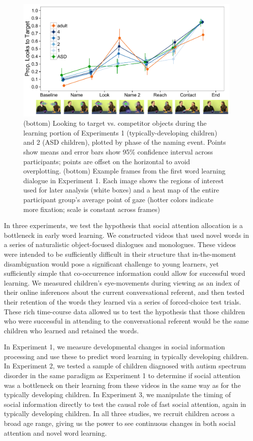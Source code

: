 \documentclass{pnastwo}
\begin{document}
\begin{article}
\begin{figure}
        \includegraphics[width=.95\textwidth]{figures/bronto_all.pdf}
	\caption{\label{fig:reflook_learning} (bottom) Looking to target vs. competitor objects during the learning portion of Experiments 1 (typically-developing children) and 2 (ASD children), plotted by phase of the naming event. Points show means and error bars show 95\% confidence interval across participants; points are offset on the horizontal to avoid overplotting. (bottom) Example frames from the first word learning dialogue in Experiment 1. Each image shows the regions of interest used for later analysis (white boxes) and a heat map of the entire participant group's average point of gaze (hotter colors indicate more fixation; scale is constant across frames)}
\end{figure}

In three experiments, we test the hypothesis that social attention allocation is a bottleneck in early word learning. We constructed videos that used novel words in a series of naturalistic object-focused dialogues and monologues. These videos were intended to be sufficiently difficult in their structure that in-the-moment disambiguation would pose a significant challenge to young learners, yet sufficiently simple that co-occurrence information could allow for successful word learning. We measured children's eye-movements during viewing as an index of their online inferences about the current conversational referent, and then tested their retention of the words they learned via a series of forced-choice test trials. These rich time-course data allowed us to test the hypothesis that those children who were successful in attending to the conversational referent would be the same children who learned and retained the words. 

In Experiment 1, we measure developmental changes in social information processing and use these to predict word learning in typically developing children. In Experiment 2, we tested a sample of children diagnosed with autism spectrum disorder in the same paradigm as Experiment 1 to determine if social attention was a bottleneck on their learning from these videos in the same way as for the typically developing children. In Experiment 3, we manipulate the timing of social information directly to test the causal role of fast social attention, again in typically developing children. In all three studies, we recruit children across a broad age range, giving us the power to see continuous changes in both social attention and novel word learning. 


\end{article}
\end{document}
